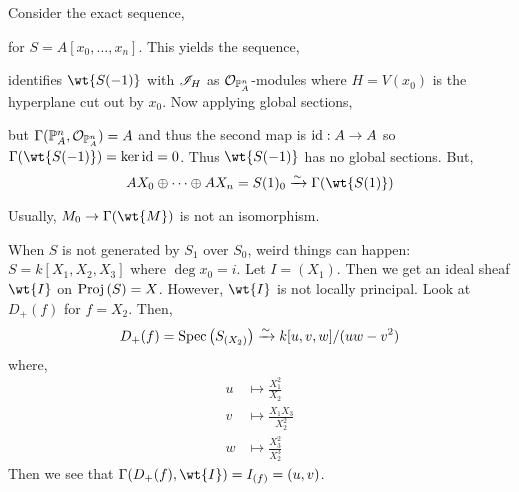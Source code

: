 \documentclass[12pt]{article}
\begin{document}
\begin{example}
Consider the exact sequence,
\begin{center}
\end{center}
for $S = A[x_0, \dots, x_n]$. This yields the sequence,
\begin{center}
\end{center}
identifies $\wt{S(-1)}$ with $\mathscr{I}_{H}$ as $\mathcal{O}_{\mathbb{P}^n_A}$-modules where $H = V(x_0)$ is the hyperplane cut out by $x_0$. Now applying global sections,
\begin{center}
\end{center}
but $\Gamma(\mathbb{P}^n_A, \mathcal{O}_{\mathbb{P}^n_A}) = A$ and thus the second map is $\mathrm{id} : A \to A$ so $\Gamma(\wt{S(-1)}) = \ker{\id} = 0$. Thus $\wt{S(-1)}$ has no global sections. But,
\[ A X_0 \oplus \cdots \oplus A X_n = S(1)_0 \iso \Gamma(\wt{S(1)}) \]
\end{example}

\begin{rmk}
Usually, $M_0 \to \Gamma(\wt{M})$ is not an isomorphism. 
\end{rmk}

\begin{example}
When $S$ is not generated by $S_1$ over $S_0$, weird things can happen: $S = k[X_1, X_2, X_3]$ where $\deg{x_0} = i$. Let $I = (X_1)$. Then we get an ideal sheaf $\wt{I}$ on $\mathrm{Proj}\left( S \right) = X$. However, $\wt{I}$ is not locally principal. Look at $D_+(f)$ for $f = X_2$. Then,
\[ D_+(f) = \mathrm{Spec}\left( S_{(X_2)} \right) \xrightarrow{\sim} k[u,v,w]/(uw - v^2) \]
where,
\begin{align*}
u & \mapsto \frac{X_1^2}{X_2}
\\
v & \mapsto \frac{X_1 X_3}{X_2^2}
\\
w & \mapsto \frac{X_3^2}{X_2^3}
\end{align*}
Then we see that $\Gamma(D_+(f), \wt{I}) = I_{(f)} = (u, v)$.
\end{example}
\end{document}
